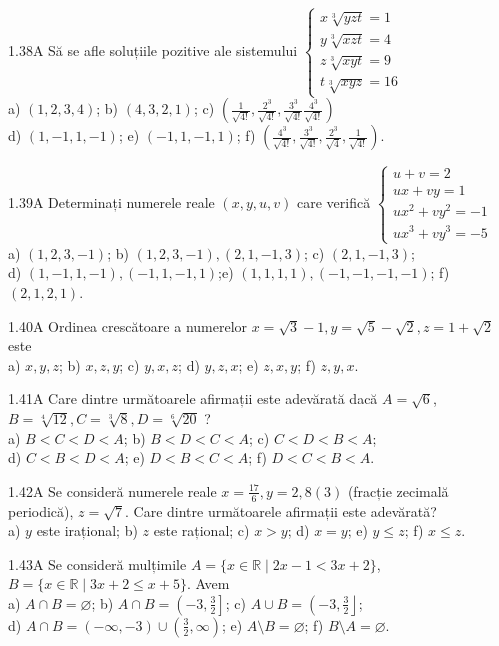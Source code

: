 \documentclass[11pt]{article}
\begin{document}
1.38A Să se afle soluțiile pozitive ale sistemului $\left\{\begin{array}{l}x \sqrt[3]{y z t}=1 \\ y \sqrt[3]{x z t}=4 \\ z \sqrt[3]{x y t}=9 \\ t \sqrt[3]{x y z}=16\end{array}\right.$\\ a) $(1,2,3,4)$; b) $(4,3,2,1)$; c) $\left(\frac{1}{\sqrt{4!}}, \frac{2^{3}}{\sqrt{4!}}, \frac{3^{3}}{\sqrt{4!}} \frac{4^{3}}{\sqrt{4!}}\right)$\\ d) $(1,-1,1,-1)$; e) $(-1,1,-1,1)$; f) $\left(\frac{4^{3}}{\sqrt{4!}}, \frac{3^{3}}{\sqrt{4!}}, \frac{2^{3}}{\sqrt{4}}, \frac{1}{\sqrt{4!}}\right)$.

1.39A Determinați numerele reale $(x, y, u, v)$ care verifică $\left\{\begin{array}{l}u+v=2 \\ u x+v y=1 \\ u x^{2}+v y^{2}=-1 \\ u x^{3}+v y^{3}=-5\end{array}\right.$\\ a) $(1,2,3,-1)$; b) $(1,2,3,-1),(2,1,-1,3)$; c) $(2,1,-1,3)$;\\ d) $(1,-1,1,-1),(-1,1,-1,1)$;e) $(1,1,1,1),(-1,-1,-1,-1)$; f) $(2,1,2,1)$.

1.40A Ordinea crescătoare a numerelor $x=\sqrt{3}-1, y=\sqrt{5}-\sqrt{2}, z=1+\sqrt{2}$ este\\ a) $x, y, z$; b) $x, z, y$; c) $y, x, z$; d) $y, z, x$; e) $z, x, y$; f) $z, y, x$.

1.41A Care dintre următoarele afirmații este adevărată dacă $A=\sqrt{6}$, $B=\sqrt[4]{12}, C=\sqrt[3]{8}, D=\sqrt[6]{20}$ ?\\ a) $B<C<D<A$; b) $B<D<C<A$; c) $C<D<B<A$;\\ d) $C<B<D<A$; e) $D<B<C<A$; f) $D<C<B<A$.

1.42A Se consideră numerele reale $x=\frac{17}{6}, y=2,8(3)$ (fracție zecimală periodică), $z=\sqrt{7}$. Care dintre următoarele afirmații este adevărată?\\ a) $y$ este irațional; b) $z$ este rațional; c) $x>y$; d) $x=y$; e) $y \leq z$; f) $x \leq z$.

1.43A Se consideră mulțimile $A=\{x \in \mathbb{R} \mid 2 x-1<3 x+2\}$,\\$B=\{x \in \mathbb{R} \mid 3 x+2 \leq x+5\}$. Avem\\ a) $A \cap B=\varnothing$; b) $A \cap B=\left(-3, \frac{3}{2}\right]$; c) $A \cup B=\left(-3, \frac{3}{2}\right\rfloor $;\\ d) $A \cap B=(-\infty,-3) \cup\left(\frac{3}{2}, \infty\right)$; e) $A \setminus B=\varnothing$; f) $B \setminus A=\varnothing$.
\end{document}
